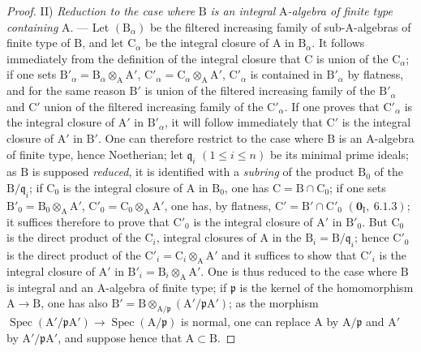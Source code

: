\begin{proof}
II) \emph{Reduction to the case where} $\mathrm{B}$ \emph{is an integral} $\mathrm{A}$\emph{-algebra of finite type containing} $\mathrm{A}$. --- Let $(\mathrm{B}_\alpha)$
be the filtered increasing family of sub-$\mathrm{A}$-algebras of finite type of $\mathrm{B}$, and let $\mathrm{C}_\alpha$ be the integral
closure of $\mathrm{A}$ in $\mathrm{B}_\alpha$. It follows immediately from the definition of the integral closure that $\mathrm{C}$
is union of the $\mathrm{C}_\alpha$; if one sets $\mathrm{B}'_\alpha=\mathrm{B}_\alpha\otimes_\mathrm{A}\mathrm{A}'$, $\mathrm{C}'_\alpha=\mathrm{C}_\alpha\otimes_\mathrm{A}\mathrm{A}'$, $\mathrm{C}'_\alpha$ is contained in $\mathrm{B}'_\alpha$
by flatness, and for the same reason $\mathrm{B}'$ is union of the filtered increasing family of the
$\mathrm{B}'_\alpha$ and $\mathrm{C}'$ union of the filtered increasing family of the $\mathrm{C}'_\alpha$. If one proves that $\mathrm{C}'_\alpha$
is the integral closure of $\mathrm{A}'$ in $\mathrm{B}'_\alpha$, it will follow immediately that $\mathrm{C}'$ is the integral
closure of $\mathrm{A}'$ in $\mathrm{B}'$. One can therefore restrict to the case where $\mathrm{B}$ is an $\mathrm{A}$-algebra of
finite type, hence Noetherian; let $\mathfrak{q}_i$ $(1\leqslant i\leqslant n)$ be its minimal prime ideals; as $\mathrm{B}$
is supposed \emph{reduced}, it is identified with a \emph{subring} of the product $\mathrm{B}_0$ of the $\mathrm{B}/\mathfrak{q}_i$; if $\mathrm{C}_0$ is the integral closure of $\mathrm{A}$ in $\mathrm{B}_0$, one has $\mathrm{C}=\mathrm{B}\cap\mathrm{C}_0$; if one sets $\mathrm{B}'_0=\mathrm{B}_0\otimes_\mathrm{A}\mathrm{A}'$, $\mathrm{C}'_0=\mathrm{C}_0\otimes_\mathrm{A}\mathrm{A}'$, one has,
by flatness, $\mathrm{C}'=\mathrm{B}'\cap\mathrm{C}'_0$ $(\mathbf{0}_\mathrm{I},~6.1.3)$; it suffices therefore to prove that $\mathrm{C}'_0$ is the integral
closure of $\mathrm{A}'$ in $\mathrm{B}'_0$. But $\mathrm{C}_0$ is the direct product of the $\mathrm{C}_i$, integral closures of $\mathrm{A}$ in the $\mathrm{B}_i=\mathrm{B}/\mathfrak{q}_i$; hence $\mathrm{C}'_0$ is the direct product of the $\mathrm{C}'_i=\mathrm{C}_i\otimes_\mathrm{A}\mathrm{A}'$ and it suffices to show that $\mathrm{C}'_i$ is the integral closure of $\mathrm{A}'$ in $\mathrm{B}'_i=\mathrm{B}_i\otimes_\mathrm{A}\mathrm{A}'$. One is thus reduced to the case where $\mathrm{B}$ is integral and an $\mathrm{A}$-algebra of finite type; if $\mathfrak{p}$ is the kernel of the homomorphism $\mathrm{A}\to\mathrm{B}$, one has also $\mathrm{B}'=\mathrm{B}\otimes_{\mathrm{A}/\mathfrak{p}}(\mathrm{A}'/\mathfrak{p}\mathrm{A}')$; as the morphism $\operatorname{Spec}(\mathrm{A}'/\mathfrak{p}\mathrm{A}')\to\operatorname{Spec}(\mathrm{A}/\mathfrak{p})$ is normal, one can replace $\mathrm{A}$ by $\mathrm{A}/\mathfrak{p}$ and $\mathrm{A}'$ by $\mathrm{A}'/\mathfrak{p}\mathrm{A}'$, and suppose hence that $\mathrm{A}\subset\mathrm{B}$.


\end{proof}
